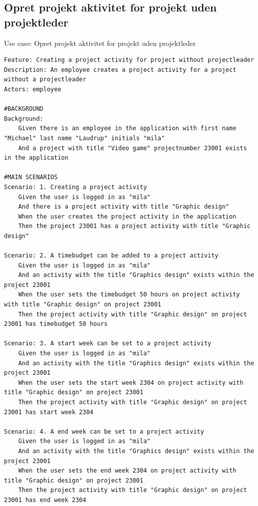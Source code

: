 \subsection{Opret projekt aktivitet for projekt uden projektleder} 
\begin{listing}[H]
    \centering
    \caption{Use case: Opret projekt aktivitet for projekt uden projektleder} \label{lst:usecase_project_activity_no_leader}
    \begin{verbatim}  
Feature: Creating a project activity for project without projectleader
Description: An employee creates a project activity for a project without a projectleader
Actors: employee

#BACKGROUND
Background:
    Given there is an employee in the application with first name "Michael" last name "Laudrup" initials "mila"
    And a project with title "Video game" projectnumber 23001 exists in the application

#MAIN SCENARIOS
Scenario: 1. Creating a project activity
    Given the user is logged in as "mila"
    And there is a project activity with title "Graphic design"  
    When the user creates the project activity in the application 
    Then the project 23001 has a project activity with title "Graphic design" 

Scenario: 2. A timebudget can be added to a project activity
    Given the user is logged in as "mila"
    And an activity with the title "Graphics design" exists within the project 23001
    When the user sets the timebudget 50 hours on project activity with title "Graphic design" on project 23001
    Then the project activity with title "Graphic design" on project 23001 has timebudget 50 hours 

Scenario: 3. A start week can be set to a project activity
    Given the user is logged in as "mila"
    And an activity with the title "Graphics design" exists within the project 23001
    When the user sets the start week 2304 on project activity with title "Graphic design" on project 23001
    Then the project activity with title "Graphic design" on project 23001 has start week 2304

Scenario: 4. A end week can be set to a project activity
    Given the user is logged in as "mila"
    And an activity with the title "Graphics design" exists within the project 23001
    When the user sets the end week 2304 on project activity with title "Graphic design" on project 23001
    Then the project activity with title "Graphic design" on project 23001 has end week 2304


\end{verbatim}
\end{listing}
